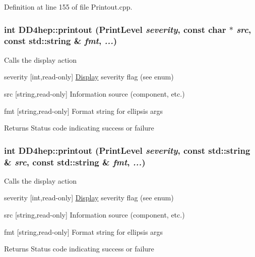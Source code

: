 Definition at line 155 of file Printout.cpp.\hypertarget{namespace_d_d4hep_a40471a3209c63eb0f25dcad8c5f0e3d6}{
\subsubsection[{printout}]{\setlength{\rightskip}{0pt plus 5cm}int DD4hep::printout (PrintLevel {\em severity}, \/  const char $\ast$ {\em src}, \/  const std::string \& {\em fmt}, \/   {\em ...})}}
\label{namespace_d_d4hep_a40471a3209c63eb0f25dcad8c5f0e3d6}
Calls the display action \begin{DoxyItemize}
\item severity \mbox{[}int,read-\/only\mbox{]} \hyperlink{class_d_d4hep_1_1_display}{Display} severity flag (see enum) \item src \mbox{[}string,read-\/only\mbox{]} Information source (component, etc.) \item fmt \mbox{[}string,read-\/only\mbox{]} Format string for ellipsis args \begin{DoxyReturn}{Returns}
Status code indicating success or failure 
\end{DoxyReturn}
\end{DoxyItemize}
\hypertarget{namespace_d_d4hep_a335f9a94367d028c2719a77bfccfb2d2}{
\subsubsection[{printout}]{\setlength{\rightskip}{0pt plus 5cm}int DD4hep::printout (PrintLevel {\em severity}, \/  const std::string \& {\em src}, \/  const std::string \& {\em fmt}, \/   {\em ...})}}
\label{namespace_d_d4hep_a335f9a94367d028c2719a77bfccfb2d2}
Calls the display action \begin{DoxyItemize}
\item severity \mbox{[}int,read-\/only\mbox{]} \hyperlink{class_d_d4hep_1_1_display}{Display} severity flag (see enum) \item src \mbox{[}string,read-\/only\mbox{]} Information source (component, etc.) \item fmt \mbox{[}string,read-\/only\mbox{]} Format string for ellipsis args \begin{DoxyReturn}{Returns}
Status code indicating success or failure 
\end{DoxyReturn}
\end{DoxyItemize}
